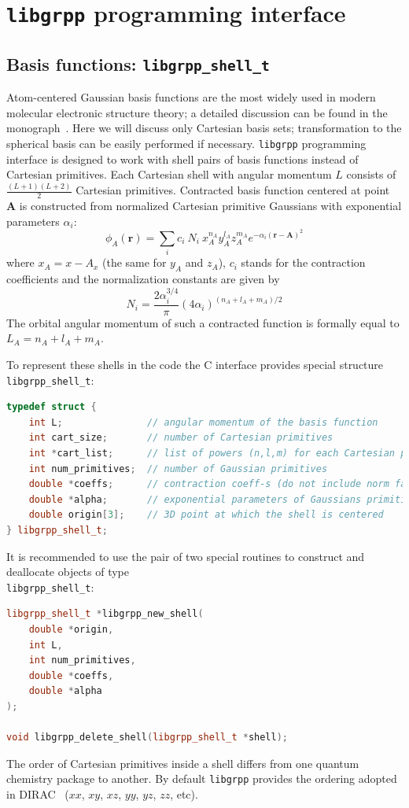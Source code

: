 \documentclass[12pt]{article}
\begin{document}
\section{\texttt{libgrpp} programming interface}

\subsection{Basis functions: \texttt{libgrpp\_shell\_t}}

Atom-centered Gaussian basis functions are the most widely used in modern molecular electronic structure theory; a detailed discussion can be found in the monograph~\cite{Helgaker:00}. Here we will discuss only Cartesian basis sets; transformation to the spherical basis can be easily performed if necessary. \texttt{libgrpp} programming interface is designed to work with shell pairs of basis functions instead of Cartesian primitives. Each Cartesian shell with angular momentum $L$ consists of $\frac{(L+1)(L+2)}{2}$ Cartesian primitives. Contracted basis function centered at point $\bm{A}$ is constructed from normalized Cartesian primitive Gaussians with exponential parameters $\alpha_i$:
%
\[
\phi_A(\bm{r}) = \sum_i c_i\ N_i\ x_A^{n_A} y_A^{l_A} z_A^{m_A} e^{-\alpha_i(\bm{r}-\bm{A})^2}
\]
%
where $x_A = x - A_x$ (the same for $y_A$ and $z_A$), $c_i$ stands for the contraction coefficients and the normalization
constants are given by
%
\[
N_i = \frac{2\alpha_i^{3/4}}{\pi} \left( 4\alpha_i \right)^{(n_A+l_A+m_A)/2}
\]
%
The orbital angular momentum of such a contracted function is formally equal to $L_A = n_A + l_A + m_A$.

To represent these shells in the code the C interface provides special structure \texttt{libgrpp\_shell\_t}:
%
\begin{lstlisting}[language=C++]
typedef struct {
    int L;               // angular momentum of the basis function
    int cart_size;       // number of Cartesian primitives
    int *cart_list;      // list of powers (n,l,m) for each Cartesian primitive
    int num_primitives;  // number of Gaussian primitives
    double *coeffs;      // contraction coeff-s (do not include norm factors)
    double *alpha;       // exponential parameters of Gaussians primitives
    double origin[3];    // 3D point at which the shell is centered
} libgrpp_shell_t;
\end{lstlisting}
%
It is recommended to use the pair of two special routines to construct and deallocate objects of type \\ \texttt{libgrpp\_shell\_t}:
%
\begin{lstlisting}[language=C++]
libgrpp_shell_t *libgrpp_new_shell(
    double *origin,
    int L,
    int num_primitives,
    double *coeffs,
    double *alpha
);

void libgrpp_delete_shell(libgrpp_shell_t *shell);
\end{lstlisting}
%
The order of Cartesian primitives inside a shell differs from one quantum chemistry package to another. By default \texttt{libgrpp} provides the ordering adopted in DIRAC~\cite{Saue:20} ($xx$, $xy$, $xz$, $yy$, $yz$, $zz$, etc).
\end{document}

